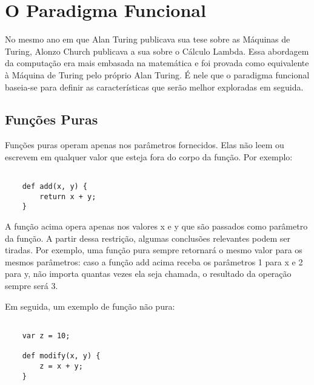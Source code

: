 \chapter{O Paradigma Funcional}



No mesmo ano em que Alan Turing publicava sua 
tese sobre as Máquinas de Turing, Alonzo Church publicava 
a sua sobre o Cálculo Lambda. Essa abordagem da computação 
era mais embasada na matemática e foi provada como 
equivalente à Máquina de Turing pelo próprio Alan Turing. 
É nele que o paradigma funcional 
baseia-se para definir as características que serão 
melhor exploradas em seguida.



\section{Funções Puras}

Funções puras operam apenas nos parâmetros fornecidos. 
Elas não leem ou escrevem em qualquer valor que esteja 
fora do corpo da função. Por exemplo:

\begin{lstlisting}[caption={Exemplo de Função Pura},label=purefunction]

    def add(x, y) {
        return x + y;
    }

\end{lstlisting}

A função acima opera apenas nos valores x e y que 
são passados como parâmetro da função. A partir 
dessa restrição, algumas conclusões relevantes podem 
ser tiradas. Por exemplo, uma função pura sempre 
retornará o mesmo valor para os mesmos parâmetros: 
caso a função add acima receba os parâmetros 1 para x 
e 2 para y, não importa quantas vezes ela seja chamada, 
o resultado da operação sempre será 3.

Em seguida, um exemplo de função não pura:

\begin{lstlisting}[caption={Exemplo de Função Pura},label=purefunction]

    var z = 10;

    def modify(x, y) {
        z = x + y;
    }

\end{lstlisting}

